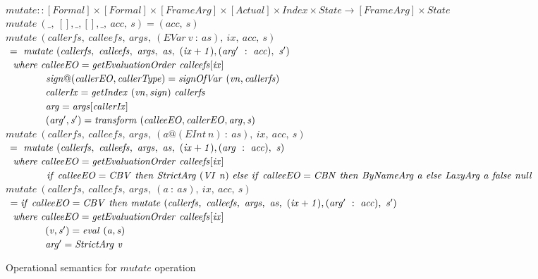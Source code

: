 \documentclass[diploma]{softlab-thesis}
\begin{document}
\begin{figure}[h]
  \\%
  $\mathit{mutate :: [Formal] \times [Formal] \times [FrameArg]
            \times [Actual] \times Index \times State \rightarrow [FrameArg] \times State} $ \\
  $\mathit{mutate~(\_,~[],\_,[],\_,~acc,~s)=(acc,~s)}$ \\
  $\mathit{mutate~(callerfs,~calleefs,~args,~(EVar~v~:~as),~ix,~acc,~s)}$ \\
  $\mathit{\hfill\ =~mutate~(callerfs,~calleefs,~args,~as,~(ix+1),(arg'~:~acc), ~s')}$ \\
  $\mathit{\hfill\ \hfill\ where~calleeEO=getEvaluationOrder~calleefs[ix]}$ \\
  $\mathit{\hfill\ \hfill\ \hfill\ \hfill\ \hfill\ \hfill\ \hfill\ \hfill\ \hfill\ \hfill\ \hfill\ \hfill\ 
            sign@(callerEO, callerType) = signOfVar~(vn, callerfs)}$ \\
  $\mathit{\hfill\ \hfill\ \hfill\ \hfill\ \hfill\ \hfill\ \hfill\ \hfill\ \hfill\ \hfill\ \hfill\ \hfill\ 
            callerIx = getIndex~(vn, sign)~callerfs}$ \\
  $\mathit{\hfill\ \hfill\ \hfill\ \hfill\ \hfill\ \hfill\ \hfill\ \hfill\ \hfill\ \hfill\ \hfill\ \hfill\ 
            arg = args[callerIx]}$ \\
  $\mathit{\hfill\ \hfill\ \hfill\ \hfill\ \hfill\ \hfill\ \hfill\ \hfill\ \hfill\ \hfill\ \hfill\ \hfill\ 
            (arg', s') = transform~(calleeEO, callerEO, arg, s)}$ \\
  $\mathit{mutate~(callerfs,~calleefs,~args,~(a@(EInt~n)~:~as),~ix,~acc,~s)}$ \\
  $\mathit{\hfill\ =~mutate~(callerfs,~calleefs,~args,~as,~(ix+1),(arg~:~acc), ~s)}$ \\
  $\mathit{\hfill\ \hfill\ where~calleeEO=getEvaluationOrder~calleefs[ix]}$ \\
  $\mathit{\hfill\ \hfill\ \hfill\ \hfill\ \hfill\ \hfill\ \hfill\ \hfill\ \hfill\ \hfill\ \hfill\ \hfill\ 
      if~calleeEO=CBV~then~StrictArg~(VI~n)~else~if~calleeEO=CBN~then~ByNameArg~a~else~LazyArg~a~false~null}$ \\
  $\mathit{mutate~(callerfs,~calleefs,~args,~(a~:~as),~ix,~acc,~s)}$ \\ 
  $\mathit{\hfill\ =if~calleeEO=CBV~then~mutate~(callerfs,~calleefs,~args,~as,~(ix+1),(arg'~:~acc), ~s')}$ \\
  $\mathit{\hfill\ \hfill\ where~calleeEO=getEvaluationOrder~calleefs[ix]}$ \\  
  $\mathit{\hfill\ \hfill\ \hfill\ \hfill\ \hfill\ \hfill\ \hfill\ \hfill\ \hfill\ \hfill\ \hfill\ \hfill\ 
            (v, s') = eval~(a, s)}$ \\
  $\mathit{\hfill\ \hfill\ \hfill\ \hfill\ \hfill\ \hfill\ \hfill\ \hfill\ \hfill\ \hfill\ \hfill\ \hfill\ 
            arg'=StrictArg~v}$ \\
\caption{Operational semantics for $\mathit{mutate}$ operation\label{fig:mutate}}
\end{figure}
\end{document}
